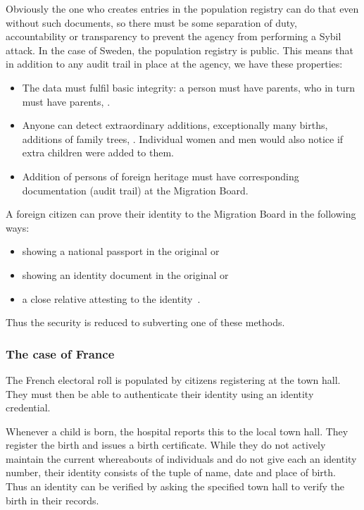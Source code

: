 Obviously the one who creates entries in the population registry can do that 
even without such documents, so there must be some separation of duty, 
accountability or transparency to prevent the agency from performing a Sybil 
attack.
In the case of Sweden, the population registry is public.
This means that in addition to any audit trail in place at the agency, we have 
these properties:
\begin{itemize}
  \item The data must fulfil basic integrity: a person must have parents, who 
    in turn must have parents, \etc.
  \item Anyone can detect extraordinary additions, \eg exceptionally many 
    births, additions of family trees, \etc.
    Individual women and men would also notice if extra children were added to 
    them.
  \item Addition of persons of foreign heritage must have corresponding 
    documentation (audit trail) at the Migration Board.
\end{itemize}
A foreign citizen can prove their identity to the Migration Board in the 
following ways:
\begin{itemize}
  \item showing a national passport in the original or
  \item showing an identity document in the original or
  \item a close relative attesting to the 
    identity~\cite{Migrationsverket-ProvenIdentity}.
\end{itemize}
Thus the security is reduced to subverting one of these methods.

\subsubsection{The case of France}

The French electoral roll is populated by citizens registering at the town 
hall.
They must then be able to authenticate their identity using an identity 
credential.

Whenever a child is born, the hospital reports this to the local town hall.
They register the birth and issues a birth certificate.
While they do not actively maintain the current whereabouts of individuals and 
do not give each an identity number, their identity consists of the tuple of 
name, date and place of birth.
Thus an identity can be verified by asking the specified town hall to verify 
the birth in their records.

